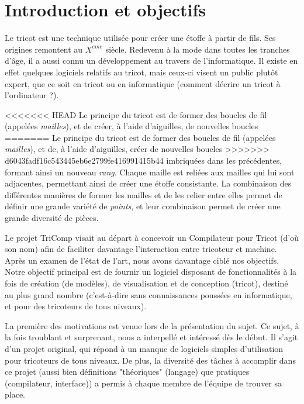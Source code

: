 \documentclass{article}
\begin{document}
\newpage

\tableofcontents

\newpage

\section{Introduction et objectifs}

Le tricot est une technique utilisée pour créer une étoffe à partir de fils. Ses origines remontent au $X^{eme}$ siècle.
Redevenu à la mode dans toutes les tranches d'âge, il a aussi connu un développement au travers de l'informatique. Il existe en effet
quelques logiciels relatifs au tricot, mais ceux-ci visent un public plutôt expert, que ce soit en tricot ou en informatique (comment
décrire un tricot à l'ordinateur ?).

<<<<<<< HEAD
Le principe du tricot est de former des boucles de fil (appelées \emph{mailles}), et de créer, à l'aide d'aiguilles, de nouvelles boucles
=======
Le principe du tricot est de former des boucles de fil (appelées \emph{mailles}), et de, à l'aide d'aiguilles, créer de nouvelles boucles
>>>>>>> d6043fadf16c543445eb6e2799fe416991415b44
imbriquées dans les précédentes, formant ainsi un nouveau \emph{rang}. Chaque maille est reliées aux mailles qui lui sont adjacentes,
permettant ainsi de créer une étoffe consistante. La combinaison des différentes manières de former les mailles et de les relier entre 
elles permet de définir une grande variété de \emph{points}, et leur combinaison permet de créer une grande diversité de pièces.

Le projet TriComp visait au départ à concevoir un Compilateur pour Tricot (d'où son nom) afin de faciliter davantage l'interaction entre
tricoteur et machine. Après un examen de l'état de l'art, nous avons davantage ciblé nos objectifs. Notre objectif principal est de
fournir un logiciel disposant de fonctionnalités à la fois de création (de modèles), de visualisation et de conception (tricot),
destiné au plus grand nombre (c'est-à-dire sans connaissances poussées en informatique, et pour des tricoteurs de tous niveaux).

La première des motivations est venue lors de la présentation du sujet. Ce sujet, à la fois troublant et surprenant, nous a interpellé et
intéressé dès le début. Il s'agit d'un projet original, qui répond à un manque de logiciels simples d'utilisation pour tricoteurs de tous
niveaux. De plus, la diversité des tâches à accomplir dans ce projet (aussi bien définitions "théoriques" (langage) que pratiques
(compilateur, interface)) a permis à chaque membre de l'équipe de trouver sa place.
\end{document}
